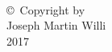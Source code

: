 
\thispagestyle{empty}
\hbox{\ }

\vfill
\renewcommand{\baselinestretch}{1}
\small\normalsize

\vspace{-.65in}

\begin{center}
\large{\copyright \hbox{ }Copyright by\\
Joseph Martin Willi  %
\\
2017}
\end{center}

\vfill
